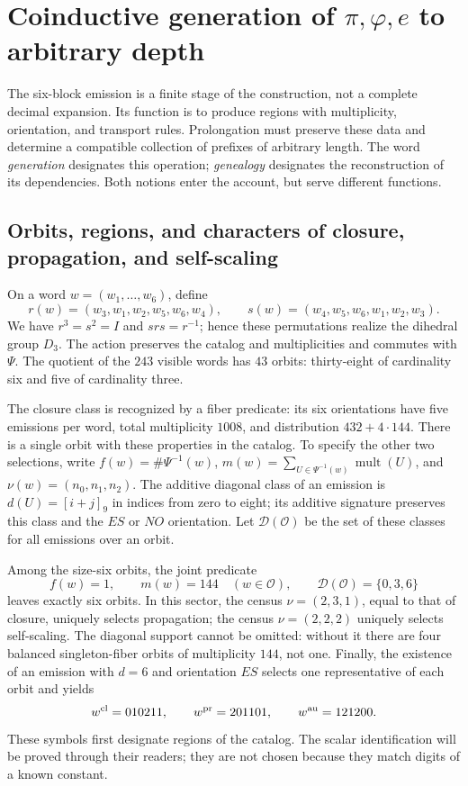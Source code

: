 \section{Coinductive generation of \texorpdfstring{\(\pi,\varphi,e\)}{pi, phi, e} to arbitrary depth}
\label{sec:generacion}

The six-block emission is a finite stage of the construction, not a complete decimal expansion. Its function is to produce regions with multiplicity, orientation, and transport rules. Prolongation must preserve these data and determine a compatible collection of prefixes of arbitrary length. The word \emph{generation} designates this operation; \emph{genealogy} designates the reconstruction of its dependencies. Both notions enter the account, but serve different functions.

\subsection{Orbits, regions, and characters of closure, propagation, and self-scaling}

On a word \(w=(w_1,\ldots,w_6)\), define
\[
 r(w)=(w_3,w_1,w_2,w_5,w_6,w_4),\qquad
 s(w)=(w_4,w_5,w_6,w_1,w_2,w_3).
\]
We have \(r^3=s^2=I\) and \(srs=r^{-1}\); hence these permutations realize the dihedral group \(D_3\). The action preserves the catalog and multiplicities and commutes with \(\Psi\). The quotient of the \(243\) visible words has \(43\) orbits: thirty-eight of cardinality six and five of cardinality three.

The closure class is recognized by a fiber predicate: its six orientations have five emissions per word, total multiplicity \(1008\), and distribution \(432+4\cdot144\). There is a single orbit with these properties in the catalog. To specify the other two selections, write \(f(w)=\#\Psi^{-1}(w)\), \(m(w)=\sum_{U\in\Psi^{-1}(w)}\operatorname{mult}(U)\), and \(\nu(w)=(n_0,n_1,n_2)\). The additive diagonal class of an emission is \(d(U)=[i+j]_9\) in indices from zero to eight; its additive signature preserves this class and the \(ES\) or \(NO\) orientation. Let \(\mathcal D(\mathcal O)\) be the set of these classes for all emissions over an orbit.

Among the size-six orbits, the joint predicate
\[
 f(w)=1,\qquad m(w)=144\quad(w\in\mathcal O),\qquad
 \mathcal D(\mathcal O)=\{0,3,6\}
\]
leaves exactly six orbits. In this sector, the census \(\nu=(2,3,1)\), equal to that of closure, uniquely selects propagation; the census \(\nu=(2,2,2)\) uniquely selects self-scaling. The diagonal support cannot be omitted: without it there are four balanced singleton-fiber orbits of multiplicity \(144\), not one. Finally, the existence of an emission with \(d=6\) and orientation \(ES\) selects one representative of each orbit and yields
\begin{equation}
 w^{\rm cl}=010211,\qquad w^{\rm pr}=201101,\qquad w^{\rm au}=121200.
 \label{eq:palabras-regionales}
\end{equation}
These symbols first designate regions of the catalog. The scalar identification will be proved through their readers; they are not chosen because they match digits of a known constant.

